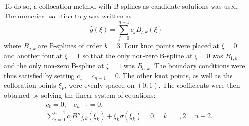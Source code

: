 \documentclass[twocolumn]{article}
\begin{document}
\begin{large}
To do so, a collocation method with B-splines as candidate solutions was used. The numerical solution to $g$ was written as 
\begin{equation}
    \hat{g}(\xi) = \sum_{j=0}^{n-1}c_jB_{j,k}(\xi)
\end{equation}
where $B_{j,k}$ are B-splines of order $k=3$. Four knot points were placed at $\xi=0$ and another four at $\xi=1$ so that the only non-zero B-spline at $\xi=0$ was $B_{1,k}$ and the only non-zero B-spline at $\xi=1$ was $B_{n,k}$. The boundary conditions were thus satisfied by setting $c_1=c_{n-1}=0$. The other knot points, as well as the collocation points $\xi_k$, were evenly spaced on $(0,1)$. The coefficients were then obtained by solving the linear system of equations:
\begin{equation}
    \begin{split}
        &c_0 = 0, \quad c_{n-1} = 0, \\ 
        &\sum_{j=0}^{n-1}c_jB''_{j,k}(\xi_k) + \xi_k\sigma(\xi_k) = 0,\quad k=1,2\dots,n-2. \\ 
    \end{split}
\end{equation}


\end{large}
\end{document}
